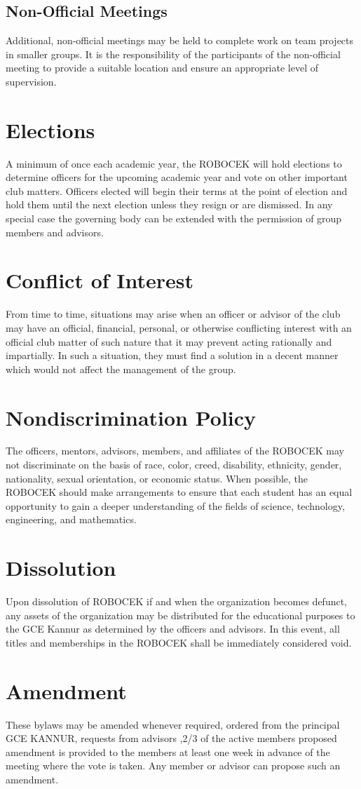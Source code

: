 \subsection{Non-Official Meetings}
Additional, non-official meetings may be held to complete work on team
projects in smaller groups. It is the responsibility of the participants of the non-official meeting to provide a suitable location and ensure an
appropriate level of supervision. 

\section{Elections}
A minimum of once each academic year, the ROBOCEK will hold elections to
determine officers for the upcoming academic year and vote on other important
club matters. Officers elected will begin their terms at the point of election and
hold them until the next election unless they resign or are dismissed. In any
special case the governing body can be extended with the permission of group
members and advisors.


\section{Conflict of Interest}
From time to time, situations may arise when an officer or advisor of the club may
have an official, financial, personal, or otherwise conflicting interest with an
official club matter of such nature that it may prevent acting rationally and impartially. In such a situation, they must find a solution in a decent manner
which would not affect the management of the group.

\section{Nondiscrimination Policy}
The officers, mentors, advisors, members, and affiliates of the ROBOCEK may
not discriminate on the basis of race, color, creed, disability, ethnicity, gender,
nationality, sexual orientation, or economic status. When possible, the
ROBOCEK should make arrangements to ensure that each student has an equal
opportunity to gain a deeper understanding of the fields of science, technology,
engineering, and mathematics.

\section{Dissolution}
Upon dissolution of ROBOCEK if and when the organization becomes defunct,
any assets of the organization may be distributed for the educational purposes to
the GCE Kannur as determined by the officers and advisors. In this event, all
titles and memberships in the ROBOCEK shall be immediately considered void.

\section{Amendment}
These bylaws may be amended whenever required, ordered from the principal
GCE KANNUR, requests from advisors ,2/3 of the active members proposed
amendment is provided to the members at least one week in advance of the
meeting where the vote is taken. Any member or advisor can propose such an
amendment.

